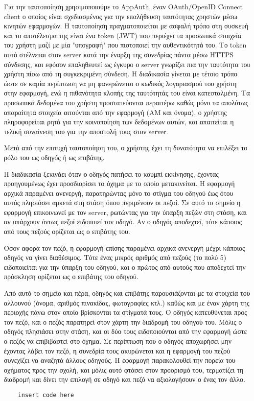 \documentclass[../thesis.tex]{subfiles}
\begin{document}
Για την ταυτοποίηση χρησιμοποιούμε το AppAuth, έναν OAuth/OpenID Connect client ο οποίος είναι σχεδιασμένος για την επαλήθευση ταυτότητας χρηστών μέσω κινητών εφαρμογών.
Η ταυτοποίηση πραγματοποιείται με ασφαλή τρόπο στη συσκευή και το αποτέλεσμα της είναι ένα token (JWT) που περιέχει τα προσωπικά στοιχεία του χρήστη μαζί με μία "υπογραφή" που πιστοποιεί την αυθεντικότητά του.
Το token αυτό στέλνεται στον server κατά την έναρξη της συνεδρίας πάντα μέσω HTTPS σύνδεσης, και εφόσον επαληθευτεί ως έγκυρο ο server γνωρίζει πια την ταυτότητα του χρήστη πίσω από τη συγκεκριμένη σύνδεση.
Η διαδικασία γίνεται με τέτοιο τρόπο ώστε σε καμία περίπτωση να μη φανερώνεται ο κωδικός λογαριασμού του χρήστη στην εφαρμογή, ενώ η πιθανότητα κλοπής της ταυτότητάς του είναι κατεσταλμένη.
Τα προσωπικά δεδομένα του χρήστη προστατεύονται περαιτέρω καθώς μόνο τα απολύτως απαραίτητα στοιχεία αιτούνται από την εφαρμογή (ΑΜ και όνομα), ο χρήστης πληροφορείται ρητά για την κοινοποίηση των δεδομένων αυτών, και απαιτείται η τελική συναίνεση του για την αποστολή τους στον server.

Μετά από την επιτυχή ταυτοποίηση του, ο χρήστης έχει τη δυνατότητα να επιλέξει το ρόλο του ως οδηγός ή ως επιβάτης.

Η διαδικασία ξεκινάει όταν ο οδηγός πατήσει το κουμπί εκκίνησης, έχοντας προηγουμένως έχει προσδιορίσει το όχημα με το οποίο μετακινείται.
Η εφαρμογή αρχικά παραμένει ανενεργή, παρατηρώντας μόνο το στίγμα του οδηγού έως ότου αυτός πλησιάσει αρκετά στη στάση όπου περιμένουν οι πεζοί.
Σε αυτό το σημείο η εφαρμογή επικοινωνεί με τον server, ρωτώντας για την ύπαρξη πεζών στη στάση, και αν υπάρχουν όντως πεζοί ειδοποιεί τον οδηγό.
Αν ο οδηγός αποδεχτεί, τότε κάποιος από τους πεζούς ορίζεται ως ο επιβάτης του.

Όσον αφορά τον πεζό, η εφαρμογή επίσης παραμένει αρχικά ανενεργή μέχρι κάποιος οδηγός να γίνει διαθέσιμος.
Τότε ένας μικρός αριθμός από πεζούς (το πολύ 5) ειδοποιείται για την ύπαρξη του οδηγού, και ο πρώτος από αυτούς που αποδεχτεί την πρόσκληση ορίζεται ως ο επιβάτης του οδηγού.

Από αυτό το σημείο και πέρα, οδηγός και επιβάτης παρουσιάζονται με τα στοιχεία του αλλουνού (όνομα, αριθμός πινακίδας, φωτογραφίες κτλ.) καθώς και με έναν χάρτη της περιοχής πάνω στον οποίο βρίσκονται τα στίγματά τους.
Ο οδηγός κατευθύνεται προς τον πεζό, και ο πεζός παρατηρεί στον χάρτη την διαδρομή του οδηγού του.
Μόλις ο οδηγός πλησιάσει στην στάση, και οι δύο τους ειδοποιούνται από την εφαρμογή ώστε ο πεζός να επιβιβαστεί στο όχημα.
Σε περίπτωση που ο οδηγός αποχωρήσει μην έχοντας λάβει τον πεζό, η συνεδρία τους ακυρώνεται και η εφαρμογή του πεζού συνεχίζει να αναζητά άλλους οδηγούς.
Η εφαρμογή παρακολουθεί την πορεία του οχήματος προς την σχολή, και μόλις αυτό φτάσει στον προορισμό του, τερματίζει τη διαδρομή και δίνει την επιλογή σε οδηγό και πεζό να αξιολογήσουν ο ένας τον άλλο.


\begin{verbatim}
    insert code here
\end{verbatim}
\end{document}
